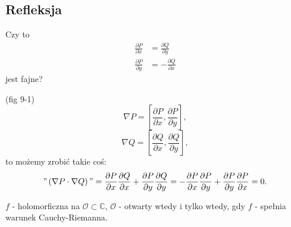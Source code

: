 \documentclass[../main.tex]{subfiles}
\begin{document}
    \subsection{Refleksja}
    Czy to
    \begin{align*}
        \frac{\partial P}{\partial x} &= \frac{\partial Q}{\partial y} \\
        \frac{\partial P}{\partial y} &= - \frac{\partial Q}{\partial x}
    \end{align*}
    jest fajne?
    \begin{przyklad}
        (fig 9-1)\\
        \[
            \nabla P = \left[ \frac{\partial P}{\partial x} , \frac{\partial P}{\partial y}  \right]
        ,\]
    \[
        \nabla Q = \left[ \frac{\partial Q}{\partial x} , \frac{\partial Q}{\partial y}  \right]
    ,\]
to możemy zrobić takie coś:
\[
    "\left( \nabla P \cdot \nabla Q \right) " = \frac{\partial P}{\partial x} \frac{\partial Q}{\partial x} + \frac{\partial P}{\partial y} \frac{\partial Q}{\partial y} = - \frac{\partial P}{\partial x} \frac{\partial P}{\partial y} + \frac{\partial P}{\partial y} \frac{\partial P}{\partial x} = 0
.\]
    \end{przyklad}
    \begin{tw}
        $f$ - holomorficzna na $\mathcal{O}\subset\mathbb{C}$, $\mathcal{O}$ - otwarty wtedy i tylko wtedy, gdy $f$ - spełnia warunek Cauchy-Riemanna.
    \end{tw}
\end{document}
